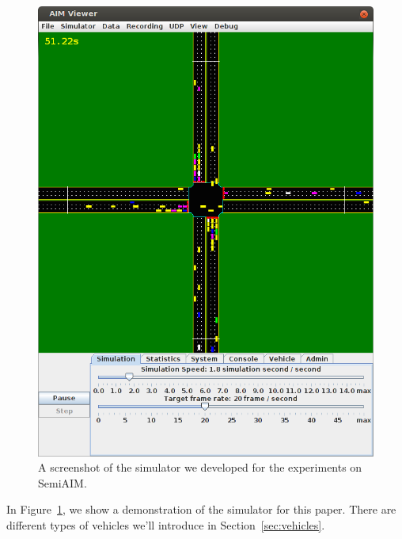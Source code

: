 \begin{figure}
\centering
\includegraphics[width=0.8\columnwidth]{figures/demo.png}
\caption{A screenshot of the simulator we developed for the experiments on
SemiAIM.}
\label{fig:demo}
\end{figure}

In Figure~\ref{fig:demo}, we show a demonstration of the simulator for
this paper. There are different types of vehicles we'll introduce in
Section~\ref{sec:vehicles}.




